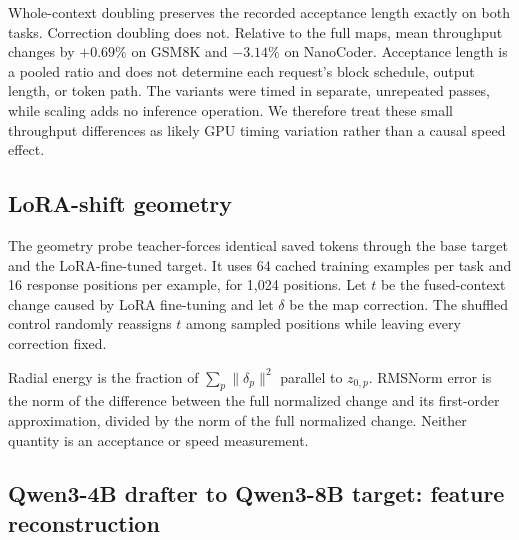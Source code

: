 Whole-context doubling preserves the recorded acceptance length exactly on both tasks. Correction doubling does not. Relative to the full maps, mean throughput changes by $+0.69\%$ on GSM8K and $-3.14\%$ on NanoCoder. Acceptance length is a pooled ratio and does not determine each request's block schedule, output length, or token path. The variants were timed in separate, unrepeated passes, while scaling adds no inference operation. We therefore treat these small throughput differences as likely GPU timing variation rather than a causal speed effect.

\subsection{LoRA-shift geometry}
\label{app:lora-geometry}

The geometry probe teacher-forces identical saved tokens through the base target and the LoRA-fine-tuned target. It uses 64 cached training examples per task and 16 response positions per example, for 1,024 positions. Let $t$ be the fused-context change caused by LoRA fine-tuning and let $\delta$ be the map correction. The shuffled control randomly reassigns $t$ among sampled positions while leaving every correction fixed.

\begin{table}[ht!]
\centering
\caption{Complete LoRA-shift geometry results. Cosine similarity, radial energy fraction, and relative linearization error are dimensionless.}
\label{tab:app-lora-geometry}
\small
{}
\end{table}

Radial energy is the fraction of $\sum_p\|\delta_p\|^2$ parallel to $z_{0,p}$. RMSNorm error is the norm of the difference between the full normalized change and its first-order approximation, divided by the norm of the full normalized change. Neither quantity is an acceptance or speed measurement.

\subsection{Qwen3-4B drafter to Qwen3-8B target: feature reconstruction}
\label{app:transfer-geometry}


